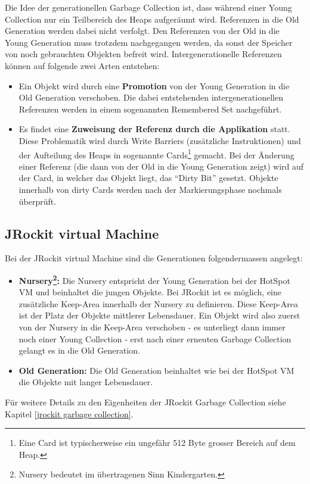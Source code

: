 Die Idee der generationellen Garbage Collection ist, dass während einer Young Collection nur ein Teilbereich des Heaps aufgeräumt wird. Referenzen in die Old Generation werden dabei nicht verfolgt. Den Referenzen von der Old in die Young Generation muss trotzdem nachgegangen werden, da sonst der Speicher von noch gebrauchten Objekten befreit wird. Intergenerationelle Referenzen können auf folgende zwei Arten entstehen:
\begin{itemize}
	\item Ein Objekt wird durch eine  \textbf{Promotion} von der Young Generation in die Old Generation verschoben. Die dabei entstehenden intergenerationellen Referenzen werden in einem sogenannten Remembered Set nachgeführt. 
	\item Es findet eine \textbf{Zuweisung der Referenz durch die Applikation} statt. Diese Problematik wird durch Write Barriers (zusätzliche Instruktionen) und der Aufteilung des Heaps in sogenannte Cards\footnote{Eine Card ist typischerweise ein ungefähr 512 Byte grosser Bereich auf dem Heap.} gemacht. Bei der Änderung einer Referenz (die dann von der Old in die Young Generation zeigt) wird auf der Card, in welcher das Objekt liegt, das ``Dirty Bit'' gesetzt. Objekte innerhalb von dirty Cards werden nach der Markierungsphase nochmals überprüft.
\end{itemize}

\subsection{JRockit virtual Machine}
Bei der JRockit virtual Machine sind die Generationen folgendermassen angelegt:
\begin{itemize}
	\item \textbf{Nursery\footnote{Nursery bedeutet im übertragenen Sinn Kindergarten.}:} Die Nursery entspricht der Young Generation bei der HotSpot VM und beinhaltet die jungen Objekte. Bei JRockit ist es möglich, eine zusätzliche Keep-Area innerhalb der Nursery zu definieren. Diese Keep-Area ist der Platz der Objekte mittlerer Lebensdauer. Ein Objekt wird also zuerst von der Nursery in die Keep-Area verschoben - es unterliegt dann immer noch einer Young Collection - erst nach einer erneuten Garbage Collection gelangt es in die Old Generation.
	\item \textbf{Old Generation: } Die Old Generation beinhaltet wie bei der HotSpot VM die Objekte mit langer Lebensdauer.
\end{itemize}
Für weitere Details zu den Eigenheiten der JRockit Garbage Collection siehe Kapitel \ref{jrockit garbage collection}.


